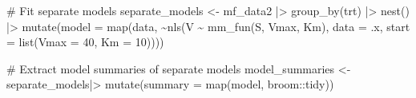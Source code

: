 \documentclass[
  letterpaper,
]{book}
\newenvironment{Shaded}{\begin{snugshade}}{\end{snugshade}}
\newcommand{\AttributeTok}[1]{\textcolor[rgb]{0.40,0.45,0.13}{#1}}
\newcommand{\CommentTok}[1]{\textcolor[rgb]{0.37,0.37,0.37}{#1}}
\newcommand{\DecValTok}[1]{\textcolor[rgb]{0.68,0.00,0.00}{#1}}
\newcommand{\FunctionTok}[1]{\textcolor[rgb]{0.28,0.35,0.67}{#1}}
\newcommand{\NormalTok}[1]{\textcolor[rgb]{0.00,0.23,0.31}{#1}}
\newcommand{\OtherTok}[1]{\textcolor[rgb]{0.00,0.23,0.31}{#1}}
\newcommand{\SpecialCharTok}[1]{\textcolor[rgb]{0.37,0.37,0.37}{#1}}
\begin{document}
\begin{Shaded}
\begin{Highlighting}[]
\CommentTok{\# Fit separate models}
\NormalTok{separate\_models }\OtherTok{\textless{}{-}}\NormalTok{ mf\_data2 }\SpecialCharTok{|\textgreater{}}
  \FunctionTok{group\_by}\NormalTok{(trt) }\SpecialCharTok{|\textgreater{}}
  \FunctionTok{nest}\NormalTok{() }\SpecialCharTok{|\textgreater{}}
  \FunctionTok{mutate}\NormalTok{(}\AttributeTok{model =} \FunctionTok{map}\NormalTok{(data, }\SpecialCharTok{\textasciitilde{}}\FunctionTok{nls}\NormalTok{(V }\SpecialCharTok{\textasciitilde{}} \FunctionTok{mm\_fun}\NormalTok{(S, Vmax, Km),}
                                \AttributeTok{data =}\NormalTok{ .x,}
                                \AttributeTok{start =} \FunctionTok{list}\NormalTok{(}\AttributeTok{Vmax =} \DecValTok{40}\NormalTok{, }\AttributeTok{Km =} \DecValTok{10}\NormalTok{))))}

\CommentTok{\# Extract model summaries of separate models}
\NormalTok{model\_summaries }\OtherTok{\textless{}{-}}\NormalTok{ separate\_models}\SpecialCharTok{|\textgreater{}}
  \FunctionTok{mutate}\NormalTok{(}\AttributeTok{summary =} \FunctionTok{map}\NormalTok{(model, broom}\SpecialCharTok{::}\NormalTok{tidy))}


\end{Highlighting}
\end{Shaded}
\end{document}
